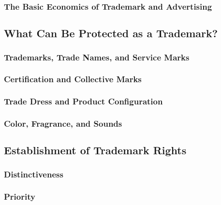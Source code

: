 \subsubsection{The Basic Economics of Trademark and Advertising}


\subsection{What Can Be Protected as a Trademark?}

\subsubsection{Trademarks, Trade Names, and Service Marks}


\subsubsection{Certification and Collective Marks}


\subsubsection{Trade Dress and Product Configuration}


\subsubsection{Color, Fragrance, and Sounds}


\subsection{Establishment of Trademark Rights}

\subsubsection{Distinctiveness}


\subsubsection{Priority}


